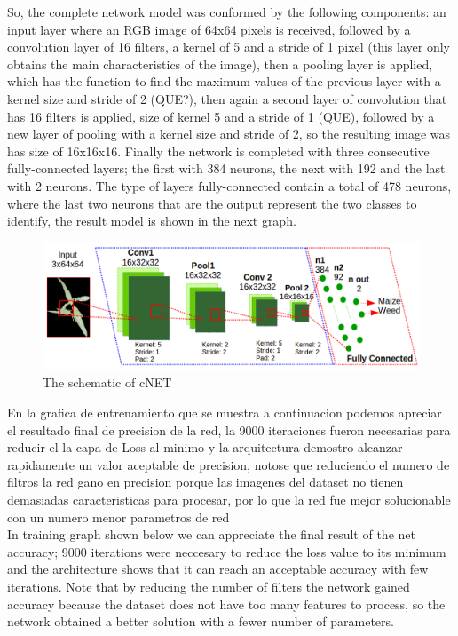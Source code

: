 \documentclass[conference]{IEEEtran}
\begin{document}
So, the complete network model was conformed by the following components: an input layer where an RGB image of 64x64 pixels is received, followed by a convolution layer of 16 filters, a kernel of 5 and a stride of 1 pixel (this layer only obtains the main characteristics of the image), then a pooling layer is applied, which has the function to find the maximum values of the previous layer with a kernel size and stride of 2 (QUE?), then again a second layer of convolution that has 16 filters is applied, size of kernel 5 and a stride of 1 (QUE), followed by a new layer of pooling with a kernel size and stride of 2, so the resulting image was has size of 16x16x16. Finally the network is completed with three consecutive fully-connected layers; the first with 384 neurons, the next with 192 and the last with 2 neurons. The type of layers fully-connected contain a total of 478 neurons, where the last two neurons that are the output represent the two classes to identify, the result model is shown in the next graph.\\
	
	\begin{figure}[h]
	\centering
	\includegraphics[width=3.5 in]{arquitectura}
	\caption{ The schematic of cNET }
	\label{fig_sim}
	\end{figure}
	
En la grafica de entrenamiento que se muestra a continuacion podemos apreciar el resultado final de precision de la red, la 9000 iteraciones fueron necesarias para reducir el la capa de Loss al minimo y la arquitectura demostro alcanzar rapidamente un valor aceptable de precision, notose que reduciendo el numero de filtros la red gano en precision porque las imagenes del dataset no tienen demasiadas caracteristicas para procesar, por lo que la red fue mejor solucionable con un numero menor parametros de red\\
	
In training graph shown below we can appreciate the final result of the net accuracy; 9000 iterations were neccesary to reduce the loss value to its minimum and the architecture shows that it can reach an acceptable accuracy with few iterations. Note that by reducing the number of filters the network gained accuracy because the dataset does not have too many features to process, so the network obtained a better solution with a fewer number of parameters.      \\
\end{document}
